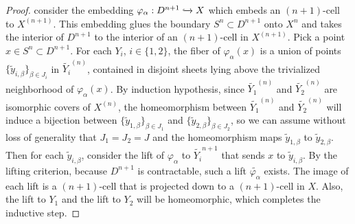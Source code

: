\documentclass{article}
\begin{document}
\begin{enumerate}
\begin{enumerate}
\begin{proof}
        consider the embedding
        $\varphi_\alpha:D^{n+1}\xhookrightarrow{}X$ which embeds an
        $(n+1)$-cell to $X^{(n+1)}$. This embedding glues the boundary
        $S^n\subset D^{n+1}$ onto $X^n$ and takes the interior of $D^{n+1}$
        to the interior of an $(n+1)$-cell in $X^{(n+1)}$. Pick a point
        $x\in S^n\subset D^{n+1}$. For each $Y_i$, $i\in\{1,2\}$, the fiber
        of $\varphi_\alpha(x)$ is a union of points
        $\{\widetilde{y}_{i,\beta}\}_{\beta\in J_i}$ in
        $\widetilde{Y_i}^{(n)}$, contained in disjoint sheets lying above
        the trivialized neighborhood of $\varphi_\alpha(x)$. By induction
        hypothesis, since $\widetilde{Y_1}^{(n)}$ and
        $\widetilde{Y_2}^{(n)}$ are isomorphic covers of $X^{(n)}$, the
        homeomorphism between $\widetilde{Y_1}^{(n)}$ and
        $\widetilde{Y_2}^{(n)}$ will induce a bijection between
        $\{\widetilde{y}_{1,\beta}\}_{\beta\in J_1}$ and
        $\{\widetilde{y}_{2,\beta}\}_{\beta\in J_2}$, so we can assume
        without loss of generality that $J_1=J_2=J$ and the homeomorphism
        maps $\widetilde{y}_{1,\beta}$ to $\widetilde{y}_{2,\beta}$. Then
        for each $\widetilde{y}_{i,\beta}$, consider the lift of
        $\varphi_\alpha$ to $\widetilde{Y_i}^{n+1}$ that sends $x$ to
        $\widetilde{y}_{i,\beta}$. By the lifting criterion, because
        $D^{n+1}$ is contractable, such a lift
        $\widetilde{\varphi_\alpha}$ exists. The image of each lift is a
        $(n+1)$-cell that is projected down to a $(n+1)$-cell in $X$.
        Also, the lift to $Y_1$ and the lift to $Y_2$ will be
        homeomorphic, which completes the inductive step.
      \end{proof}
    \end{enumerate}
\end{enumerate}
\end{document}
